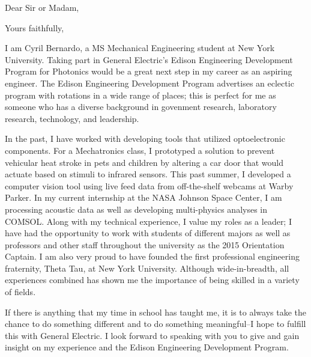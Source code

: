 \documentclass[11pt,a4paper,sans]{moderncv}        %
\newcommand{\CompanyName}{General Electric}
\newcommand{\ProgramName}{Edison Engineering Development Program}
\newcommand{\PositionName}{Photonics}
\begin{document}
\recipient{\CompanyName{}}{}
\date{\today}
\opening{Dear Sir or Madam,}
\closing{Yours faithfully,}
\makelettertitle

I am Cyril Bernardo, a MS Mechanical Engineering student at New York University. Taking part in \CompanyName{}'s \ProgramName{} for \PositionName{} would be a great  next step in my career as an aspiring engineer. The \ProgramName{} advertises an eclectic program with rotations in a wide range of places; this is perfect for me as someone who has a diverse background in govenment research, laboratory research, technology, and leadership.

In the past, I have worked with developing tools that utilized optoelectronic components. For a Mechatronics class, I prototyped a solution to prevent vehicular heat stroke in pets and children by altering a car door that would actuate based on stimuli to infrared sensors. This past summer, I developed a computer vision tool using live feed data from off-the-shelf webcams at Warby Parker. In my current internship at the NASA Johnson Space Center, I am processing acoustic data as well as developing multi-physics analyses in COMSOL. Along with my technical experience, I value my roles as a leader; I have had the opportunity to work with students of different majors as well as professors and other staff throughout the university as the 2015 Orientation Captain. I am also very proud to have founded the first professional engineering fraternity, Theta Tau, at New York University. Although wide-in-breadth, all experiences combined has shown me the importance of being skilled in a variety of fields.

If there is anything that my time in school has taught me, it is to always take the chance to do something different and to do something meaningful--I hope to fulfill this with \CompanyName{}. I look forward to speaking with you to give and gain insight on my experience and the \ProgramName{}.


\makeletterclosing
\end{document}
